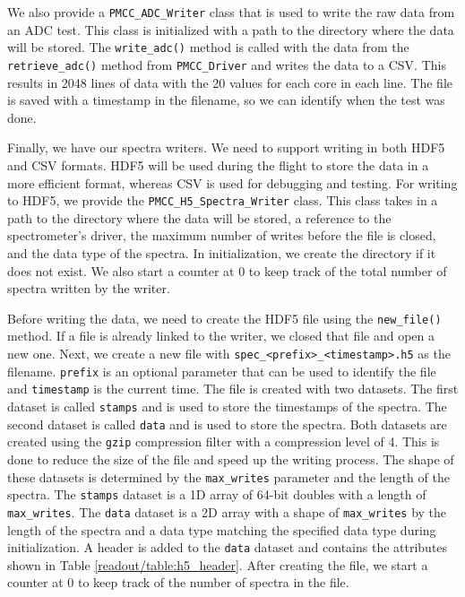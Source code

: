 We also provide a \texttt{PMCC\_ADC\_Writer} class that is used to write the raw data from an ADC test. 
This class is initialized with a path to the directory where the data will be stored.
The \texttt{write\_adc()} method is called with the data from the \texttt{retrieve\_adc()} method from \texttt{PMCC\_Driver} and writes the data to a CSV.
This results in 2048 lines of data with the 20 values for each core in each line.
The file is saved with a timestamp in the filename, so we can identify when the test was done. 

Finally, we have our spectra writers. 
We need to support writing in both HDF5 and CSV formats.
HDF5 will be used during the flight to store the data in a more efficient format, whereas CSV is used for debugging and testing.
For writing to HDF5, we provide the \texttt{PMCC\_H5\_Spectra\_Writer} class.
This class takes in a path to the directory where the data will be stored, a reference to the spectrometer's driver, the maximum number of writes before the file is closed, and the data type of the spectra. 
In initialization, we create the directory if it does not exist. 
We also start a counter at 0 to keep track of the total number of spectra written by the writer. 

Before writing the data, we need to create the HDF5 file using the \texttt{new\_file()} method.
If a file is already linked to the writer, we closed that file and open a new one.
Next, we create a new file with \texttt{spec\_<prefix>\_<timestamp>.h5} as the filename.
\texttt{prefix} is an optional parameter that can be used to identify the file and \texttt{timestamp} is the current time.
The file is created with two datasets. 
The first dataset is called \texttt{stamps} and is used to store the timestamps of the spectra.
The second dataset is called \texttt{data} and is used to store the spectra.
Both datasets are created using the \texttt{gzip} compression filter with a compression level of 4.
This is done to reduce the size of the file and speed up the writing process. 
The shape of these datasets is determined by the \texttt{max\_writes} parameter and the length of the spectra.
The \texttt{stamps} dataset is a 1D array of 64-bit doubles with a length of \texttt{max\_writes}.
The \texttt{data} dataset is a 2D array with a shape of \texttt{max\_writes} by the length of the spectra and a data type matching the specified data type during initialization.
A header is added to the \texttt{data} dataset and contains the attributes shown in Table \ref{readout/table:h5_header}.
After creating the file, we start a counter at 0 to keep track of the number of spectra in the file. 

